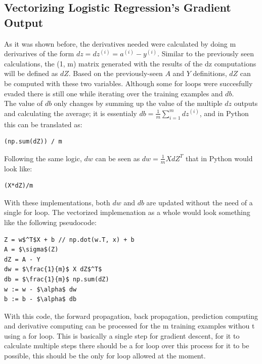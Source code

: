 \documentclass[11pt]{report}
\begin{document}
\subsection{Vectorizing Logistic Regression's Gradient Output}
As it was shown before, the derivatives needed were calculated by doing m derivarives of the form $dz = dz^{(i)} = a^{(i)} - y^{(i)}$. Similar to the previously seen calculations, the (1, m) matrix generated with the results of the dz computations will be defined as $dZ$. Based on the previously-seen $A$ and $Y$ definitions, $dZ$ can be computed with these two variables. Although some for loops were succesfully evaded there is still one while iterating over the training examples and $db$.\\
The value of $db$ only changes by summing up the value of the multiple $dz$ outputs and calculating the average; it is essentialy $db = \frac{1}{m}\sum ^m _{i=1} dz^{(i)}$, and in Python this can be translated as:
\begin{lstlisting}[mathescape=true]
(np.sum(dZ)) / m
\end{lstlisting}
Following the same logic, $dw$ can be seen as $dw = \frac{1}{m} X dZ^T$ that in Python would look like:
\begin{lstlisting}[mathescape=true]
(X*dZ)/m
\end{lstlisting}
With these implementations, both $dw$ and $db$ are updated without the need of a single for loop. The vectorized implemenation as a whole would look something like the following pseudocode:
\begin{lstlisting}[mathescape=true]
Z = w$^T$X + b // np.dot(w.T, x) + b
A = $\sigma$(Z)
dZ = A - Y
dw = $\frac{1}{m}$ X dZ$^T$
db = $\frac{1}{m}$ np.sum(dZ)
w := w - $\alpha$ dw
b := b - $\alpha$ db
\end{lstlisting}
With this code, the forward propagation, back propagation, prediction computing and derivative computing can be processed for the m training examples withou t using a for loop. This is basically a single step for gradient descent, for it to calculate multiple steps there should be a for loop over this process for it to be possible, this should be the only for loop allowed at the moment.
\end{document}
